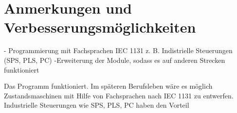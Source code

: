 \chapter{Anmerkungen und Verbesserungsmöglichkeiten}

- Programmierung mit Fachsprachen IEC 1131 z. B. Indistrielle Steuerungen (SPS, PLS, PC)
-Erweiterung der Module, sodass es auf anderen Strecken funktioniert

Das Programm funktioniert. Im späteren Berufsleben wäre es möglich Zustandsmaschinen mit Hilfe von Fachsprachen nach IEC 1131 zu entwerfen. Industrielle Steuerungen wie SPS, PLS, PC haben den Vorteil 
